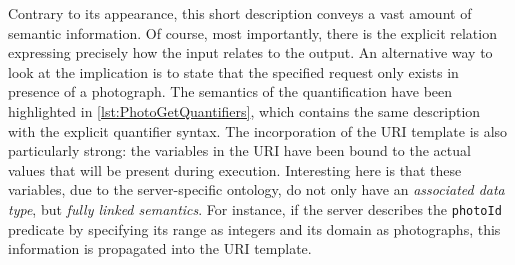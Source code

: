 \documentclass[runningheads,a4paper, twocolumn]{llncs}
\begin{document}
Contrary to its appearance, this short description conveys a vast amount of semantic information. Of course, most importantly, there is the explicit relation expressing precisely how the input relates to the output. An alternative way to look at the implication is to state that the specified request only exists in presence of a photograph. The semantics of the quantification have been highlighted in \autoref{lst:PhotoGetQuantifiers}, which contains the same description with the explicit quantifier syntax. The incorporation of the URI template is also particularly strong: the variables in the URI have been bound to the actual values that will be present during execution. Interesting here is that these variables, due to the server-specific ontology, do not only have an \emph{associated data type}, but \emph{fully linked semantics}. For instance, if the server describes the \Verb!photoId! predicate by specifying its range as integers and its domain as photographs, this information is propagated into the URI template. \label{SemanticTemplateURI}
\end{document}
